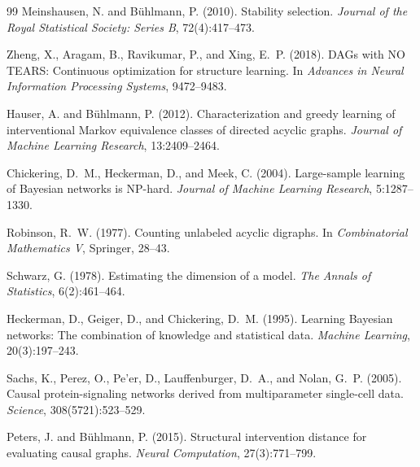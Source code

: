 \documentclass{article}
\theoremstyle{definition}
\theoremstyle{plain}
\theoremstyle{remark}
\begin{document}
\begin{thebibliography}{99}
Meinshausen, N. and B\"uhlmann, P. (2010).
Stability selection.
\textit{Journal of the Royal Statistical Society: Series B}, 72(4):417--473.

Zheng, X., Aragam, B., Ravikumar, P., and Xing, E.~P. (2018).
DAGs with NO TEARS: Continuous optimization for structure learning.
In \textit{Advances in Neural Information Processing Systems}, 9472--9483.

Hauser, A. and B\"uhlmann, P. (2012).
Characterization and greedy learning of interventional Markov equivalence
classes of directed acyclic graphs.
\textit{Journal of Machine Learning Research}, 13:2409--2464.

Chickering, D.~M., Heckerman, D., and Meek, C. (2004).
Large-sample learning of Bayesian networks is NP-hard.
\textit{Journal of Machine Learning Research}, 5:1287--1330.

Robinson, R.~W. (1977).
Counting unlabeled acyclic digraphs.
In \textit{Combinatorial Mathematics V}, Springer, 28--43.

Schwarz, G. (1978).
Estimating the dimension of a model.
\textit{The Annals of Statistics}, 6(2):461--464.

Heckerman, D., Geiger, D., and Chickering, D.~M. (1995).
Learning Bayesian networks: The combination of knowledge and statistical data.
\textit{Machine Learning}, 20(3):197--243.

Sachs, K., Perez, O., Pe'er, D., Lauffenburger, D.~A., and Nolan, G.~P. (2005).
Causal protein-signaling networks derived from multiparameter single-cell data.
\textit{Science}, 308(5721):523--529.

Peters, J. and B\"uhlmann, P. (2015).
Structural intervention distance for evaluating causal graphs.
\textit{Neural Computation}, 27(3):771--799.

\end{thebibliography}
\end{document}
